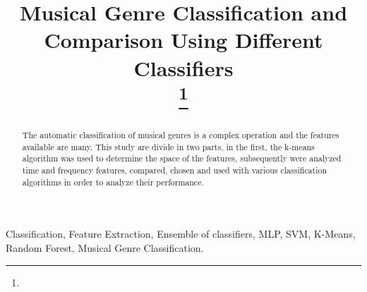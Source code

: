 \documentclass[conference]{IEEEtran}
\begin{document}
\title{Musical Genre Classification and Comparison Using Different Classifiers\\
{\footnotesize \textsuperscript{}}
\thanks{}
}

\author{
}

\maketitle

\begin{abstract}
The automatic classification of musical genres is a complex operation and the features available are many. This study are divide in two parts, in the first, the k-means algorithm was used to determine the space of the features, subsequently were analyzed time and frequency features, compared, chosen and used with various classification algorithms in order to analyze their performance.
\end{abstract}

\begin{IEEEkeywords}
Classification, Feature Extraction, Ensemble of classifiers, MLP, SVM, K-Means, Random Forest,
Musical Genre Classification.
\end{IEEEkeywords}
\end{document}
